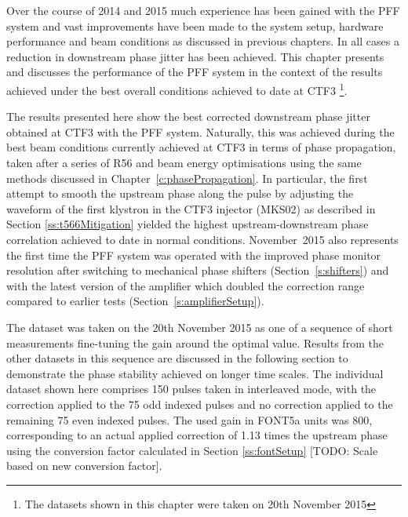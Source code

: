 
Over the course of 2014 and 2015 much experience has been gained with the PFF system and vast improvements have been made to the system setup, hardware performance and beam conditions as discussed in previous chapters. In all cases a reduction in downstream phase jitter has been achieved. This chapter presents and discusses the performance of the PFF system in the context of the results achieved under the best overall conditions achieved to date at CTF3 \footnote{The datasets shown in this chapter were taken on 20th November 2015}.




The results presented here show the best corrected downstream phase jitter obtained at CTF3 with the PFF system. Naturally, this was achieved during the best beam conditions currently achieved at CTF3 in terms of phase propagation, taken after a series of R56 and beam energy optimisations using the same methods discussed in Chapter~\ref{c:phasePropagation}. In particular, the first attempt to smooth the upstream phase along the pulse by adjusting the waveform of the first klystron in the CTF3 injector (MKS02) as described in Section \ref{ss:t566Mitigation} yielded the highest upstream-downstream phase correlation achieved to date in normal conditions. 
November~2015 also represents the first time the PFF system was operated with the improved phase monitor resolution after switching to mechanical phase shifters (Section~\ref{s:shifters}) and with the latest version of the amplifier which doubled the correction range compared to earlier tests (Section~\ref{s:amplifierSetup}).
 
The dataset was taken on the 20th November 2015 as one of a sequence of short measurements fine-tuning the gain around the optimal value. Results from the other datasets in this sequence are discussed in the following section to demonstrate the phase stability achieved on longer time scales. The individual dataset shown here comprises 150 pulses taken in interleaved mode, with the correction applied to the 75 odd indexed pulses and no correction applied to the remaining 75 even indexed pulses. The used gain in FONT5a units was 800, corresponding to an actual applied correction of 1.13 times the upstream phase using the conversion factor calculated in Section \ref{ss:fontSetup} [TODO: Scale based on new conversion factor].



